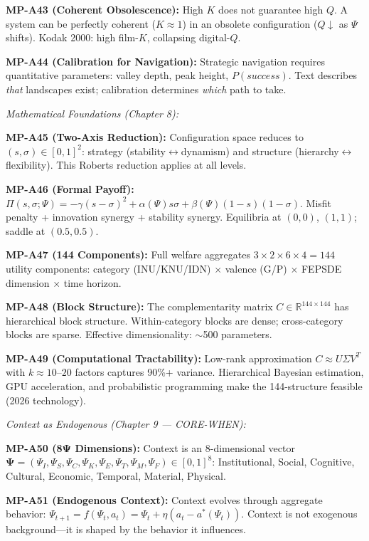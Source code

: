 \begin{tcolorbox}[colback=gray!5!white, colframe=gray!75!black,
    title=\textbf{MP Axioms}]
\textbf{MP-A43 (Coherent Obsolescence):} High $K$ does not guarantee high $Q$. A system can be perfectly coherent ($K \approx 1$) in an obsolete configuration ($Q \downarrow$ as $\Psi$ shifts). Kodak 2000: high film-$K$, collapsing digital-$Q$.

\textbf{MP-A44 (Calibration for Navigation):} Strategic navigation requires quantitative parameters: valley depth, peak height, $P(success)$. Text describes \textit{that} landscapes exist; calibration determines \textit{which} path to take.

\vspace{0.5em}
\textit{Mathematical Foundations (Chapter 8):}

\textbf{MP-A45 (Two-Axis Reduction):} Configuration space reduces to $(s, \sigma) \in [0,1]^2$: strategy (stability$\leftrightarrow$dynamism) and structure (hierarchy$\leftrightarrow$flexibility). This Roberts reduction applies at all levels.

\textbf{MP-A46 (Formal Payoff):} $\Pi(s,\sigma;\Psi) = -\gamma(s-\sigma)^2 + \alpha(\Psi)s\sigma + \beta(\Psi)(1-s)(1-\sigma)$. Misfit penalty + innovation synergy + stability synergy. Equilibria at $(0,0)$, $(1,1)$; saddle at $(0.5,0.5)$.

\textbf{MP-A47 (144 Components):} Full welfare aggregates $3 \times 2 \times 6 \times 4 = 144$ utility components: category (INU/KNU/IDN) $\times$ valence (G/P) $\times$ FEPSDE dimension $\times$ time horizon.

\textbf{MP-A48 (Block Structure):} The complementarity matrix $C \in \mathbb{R}^{144 \times 144}$ has hierarchical block structure. Within-category blocks are dense; cross-category blocks are sparse. Effective dimensionality: $\sim$500 parameters.

\textbf{MP-A49 (Computational Tractability):} Low-rank approximation $C \approx U\Sigma V^T$ with $k \approx 10$--$20$ factors captures 90\%+ variance. Hierarchical Bayesian estimation, GPU acceleration, and probabilistic programming make the 144-structure feasible (2026 technology).

\vspace{0.5em}
\textit{Context as Endogenous (Chapter 9 --- CORE-WHEN):}

\textbf{MP-A50 (8Ψ Dimensions):} Context is an 8-dimensional vector $\boldsymbol{\Psi} = (\Psi_I, \Psi_S, \Psi_C, \Psi_K, \Psi_E, \Psi_T, \Psi_M, \Psi_F) \in [0,1]^8$: Institutional, Social, Cognitive, Cultural, Economic, Temporal, Material, Physical.

\textbf{MP-A51 (Endogenous Context):} Context evolves through aggregate behavior: $\Psi_{t+1} = f(\Psi_t, a_t) = \Psi_t + \eta(a_t - a^*(\Psi_t))$. Context is not exogenous background---it is shaped by the behavior it influences.


\end{tcolorbox}
